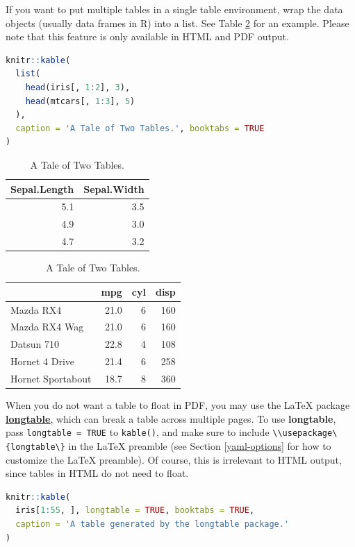\documentclass[doctor,openright,twoside]{sjtuthesis}
\newcommand{\passthrough}[1]{#1}
\theoremstyle{plain}
\theoremstyle{definition}
\theoremstyle{remark}
\theoremstyle{ocrenumbox}
\theoremstyle{plain}
\begin{document}
If you want to put multiple tables in a single table environment, wrap
the data objects (usually data frames in R) into a list. See Table
\ref{tab:table-multi} for an example. Please note that this feature is
only available in HTML and PDF output.

\begin{lstlisting}[language=R]
knitr::kable(
  list(
    head(iris[, 1:2], 3),
    head(mtcars[, 1:3], 5)
  ),
  caption = 'A Tale of Two Tables.', booktabs = TRUE
)
\end{lstlisting}

\begin{table}
\caption{\label{tab:table-multi}A Tale of Two Tables.}

\centering
\begin{tabular}[t]{rr}
\toprule
Sepal.Length & Sepal.Width\\
\midrule
5.1 & 3.5\\
4.9 & 3.0\\
4.7 & 3.2\\
\bottomrule
\end{tabular}
\centering
\begin{tabular}[t]{lrrr}
\toprule
  & mpg & cyl & disp\\
\midrule
Mazda RX4 & 21.0 & 6 & 160\\
Mazda RX4 Wag & 21.0 & 6 & 160\\
Datsun 710 & 22.8 & 4 & 108\\
Hornet 4 Drive & 21.4 & 6 & 258\\
Hornet Sportabout & 18.7 & 8 & 360\\
\bottomrule
\end{tabular}
\end{table}

When you do not want a table to float in PDF, you may use the LaTeX
package
\href{https://www.ctan.org/pkg/longtable}{\textbf{longtable},}
which can break a table across multiple pages. To use
\textbf{longtable}, pass \passthrough{\lstinline!longtable = TRUE!} to
\passthrough{\lstinline!kable()!}, and make sure to include
\passthrough{\lstinline!\\usepackage\{longtable\}!} in the LaTeX
preamble (see Section \ref{yaml-options} for how to customize the LaTeX
preamble). Of course, this is irrelevant to HTML output, since tables in
HTML do not need to float.

\begin{lstlisting}[language=R]
knitr::kable(
  iris[1:55, ], longtable = TRUE, booktabs = TRUE,
  caption = 'A table generated by the longtable package.'
)
\end{lstlisting}
\end{document}
